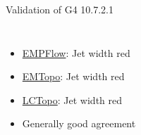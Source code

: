 \begin{frame}{Validation of G4 10.7.2.1}
\begin{columns}
\begin{column}{0.5\textwidth}
\begin{figure}
            \end{figure}
        \end{column}
    \end{columns}
        \begin{itemize}
        \item \href{https://atlas-computing.web.cern.ch/atlas-computing/links/PhysValDir/JetEtMiss/jet_21-10-21_task1/AntiKt4EMPFlowJets/index.html}{EMPFlow}: Jet width red
        \item \href{https://atlas-computing.web.cern.ch/atlas-computing/links/PhysValDir/JetEtMiss/jet_21-10-21_task1/AntiKt4EMTopoJets/index.html}{EMTopo}: Jet width red
        \item \href{https://atlas-computing.web.cern.ch/atlas-computing/links/PhysValDir/JetEtMiss/jet_21-10-21_task1/AntiKt4LCTopoJets/index.html}{LCTopo}: Jet width red
        \item Generally good agreement
    \end{itemize}
\end{frame}